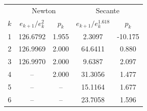 \begin{tabular}{r cc cc}
\toprule
 & \multicolumn{2}{c}{Newton} & \multicolumn{2}{c}{Secante}\\
$k$ & $e_{k+1}/e_k^{2}$ & $p_k$ & $e_{k+1}/e_k^{1.618}$ & $p_k$\\
\midrule
1 & 126.6792 & 1.955 & 2.3097 & -10.175\\
2 & 126.9969 & 2.000 & 64.6411 & 0.880\\
3 & 126.9970 & 2.000 & 9.6387 & 2.097\\
4 & -- & 2.000 & 31.3056 & 1.477\\
5 & -- & -- & 15.1164 & 1.677\\
6 & -- & -- & 23.7058 & 1.596\\
\bottomrule
\end{tabular}
